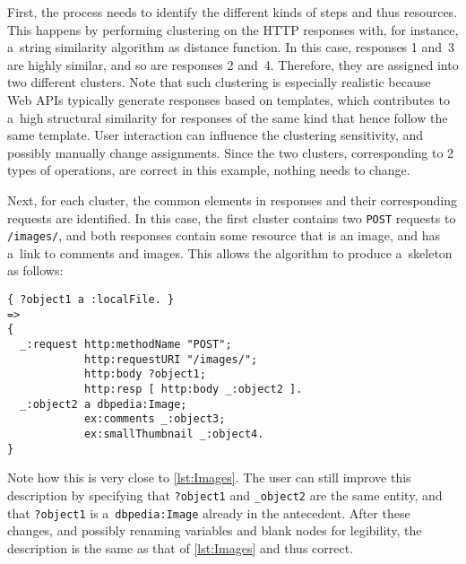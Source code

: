 First, the process needs to identify the different kinds of steps and thus resources.
This happens by performing clustering on the HTTP responses with, for instance,
a~string similarity algorithm as distance function.
In this case, responses 1 and~3 are highly similar,
and so are responses 2 and~4.
Therefore, they are assigned into two different clusters.
Note that such clustering is especially realistic
because Web APIs typically generate responses based on templates,
which contributes to a~high structural similarity
for responses of the same kind that hence follow the same template.
User interaction can influence the clustering sensitivity,
and possibly manually change assignments.
Since the two clusters, corresponding to 2 types of operations,
are correct in this example, nothing needs to change.

Next, for each cluster,
the common elements in responses and their corresponding requests are identified.
In this case, the first cluster contains two \verb!POST! requests to \verb!/images/!,
and both responses contain some resource that is an image,
and has a~link to comments and images.
This allows the algorithm to produce a~skeleton as follows:
\begin{Verbatim}
{ ?object1 a :localFile. }
=>
{
  _:request http:methodName "POST";
            http:requestURI "/images/";
            http:body ?object1;
            http:resp [ http:body _:object2 ].
  _:object2 a dbpedia:Image;
            ex:comments _:object3;
            ex:smallThumbnail _:object4.
}
\end{Verbatim}
Note how this is very close to \cref{lst:Images}.
The user can still improve this description
by specifying that \verb!?object1! and \verb!_object2! are the same entity,
and that \verb!?object1! is a~\verb!dbpedia:Image! already in the antecedent.
After these changes, and possibly renaming variables and blank nodes for legibility,
the description is the same as that of \cref{lst:Images} and thus correct.


